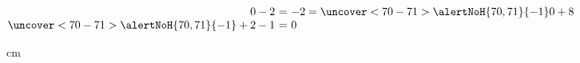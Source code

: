 \begin{frame}
{{{\hfil\hfil$\begin{array}{@{}r@{~}c@{~}l}0-2 & = & -2=\uncover<70-71>{\alertNoH{70, 71}{{-1}}}0+8 \\ \uncover<70-71>{\alertNoH{70, 71}{{-1}}}+2-1 & = & 0 \\ \end{array}$}}}

 cm
\end{frame}